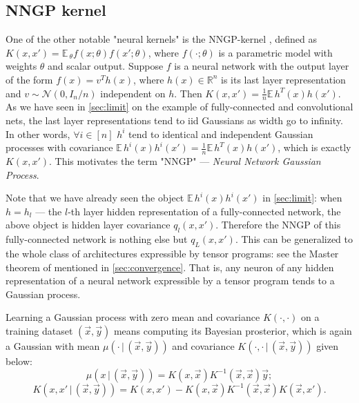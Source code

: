 \documentclass{article}
\newcommand{\EE}{\mathbb{E}\,}
\newcommand{\RR}{\mathbb{R}}
\newcommand{\NN}{\mathcal{N}}
\begin{document}
    \subsection{NNGP kernel}

    One of the other notable "neural kernels" is the NNGP-kernel \cite{lee2018deep}, defined as $K(x,x') = \EE_\theta f(x; \theta) f(x'; \theta)$, where $f(\cdot; \theta)$ is a parametric model with weights $\theta$ and scalar output.
    Suppose $f$ is a neural network with the output layer of the form $f(x) = v^T h(x)$, where $h(x) \in \RR^n$ is its last layer representation and $v \sim \NN(0, I_n / n)$ independent on $h$.
    Then $K(x,x') = \frac{1}{n} \EE h^T(x) h(x')$.
    As we have seen in \cref{sec:limit} on the example of fully-connected and convolutional nets, the last layer representations tend to iid Gaussians as width go to infinity.
    In other words, $\forall i \in [n]$ $h^i$ tend to identical and independent Gaussian processes with covariance $\EE h^i(x) h^i(x') = \frac{1}{n} \EE h^T(x) h(x')$, which is exactly $K(x,x')$.
    This motivates the term "NNGP" --- \emph{Neural Network Gaussian Process}.
    
    Note that we have already seen the object $\EE h^i(x) h^i(x')$ in \cref{sec:limit}: when $h = h_l$ --- the $l$-th layer hidden representation of a fully-connected network, the above object is hidden layer covariance $q_l(x,x')$.
    Therefore the NNGP of this fully-connected network is nothing else but $q_L(x,x')$.
    This can be generalized to the whole class of architectures expressible by tensor programs: see the Master theorem of \cite{yang2019tensor_i} mentioned in \cref{sec:convergence}.
    That is, any neuron of any hidden representation of a neural network expressible by a tensor program tends to a Gaussian process.

    Learning a Gaussian process with zero mean and covariance $K(\cdot,\cdot)$ on a training dataset $(\vec x, \vec y)$ means computing its Bayesian prosterior, which is again a Gaussian with mean $\mu(\cdot \,|\, (\vec x, \vec y))$ and covariance $K(\cdot,\cdot \,|\, (\vec x, \vec y))$ given below:
    \begin{equation}
        \mu(x \,|\, (\vec x, \vec y)) = K(x,\vec x) K^{-1}(\vec x, \vec x) \vec y;
    \end{equation}
    \begin{equation}
        K(x,x' \,|\, (\vec x, \vec y)) = K(x,x') - K(x,\vec x) K^{-1}(\vec x, \vec x) K(\vec x,x').
    \end{equation}
    
\end{document}
